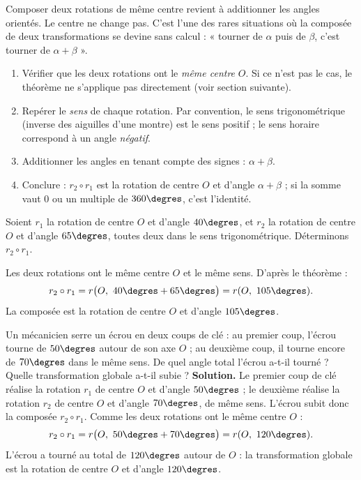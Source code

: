 \documentclass[11pt]{article}
\newcommand{\cle}[1]{{\popxbold\color{popdark}#1}}
\newcounter{popsec}
\newcounter{popsub}
\newcommand{\courssub}[1]{%
  \stepcounter{popsub}%
  \par\vspace{9pt}\noindent{\popxbold\fontsize{11.5}{13}\selectfont\color{popink}{\color{poporange}\thepopsec.\thepopsub}\hspace{6pt}#1}\par\nopagebreak\vspace{4pt}
}
\begin{document}
\begin{aretenir}
Composer deux rotations de même centre revient à \cle{additionner les angles orientés}. Le centre ne change pas. C'est l'une des rares situations où la composée de deux transformations se devine sans calcul : « tourner de $\alpha$ puis de $\beta$, c'est tourner de $\alpha + \beta$ ».
\end{aretenir}

\courssub{Méthode et exemple chiffré}

\begin{methode}
\begin{enumerate}
\item Vérifier que les deux rotations ont le \emph{même centre} $O$. Si ce n'est pas le cas, le théorème ne s'applique pas directement (voir section suivante).
\item Repérer le \emph{sens} de chaque rotation. Par convention, le sens trigonométrique (inverse des aiguilles d'une montre) est le sens positif ; le sens horaire correspond à un angle \emph{négatif}.
\item Additionner les angles en tenant compte des signes : $\alpha + \beta$.
\item Conclure : $r_2 \circ r_1$ est la rotation de centre $O$ et d'angle $\alpha + \beta$ ; si la somme vaut $0$ ou un multiple de $360\degres$, c'est l'identité.
\end{enumerate}
\end{methode}

\begin{exemplebox}
Soient $r_1$ la rotation de centre $O$ et d'angle $40\degres$, et $r_2$ la rotation de centre $O$ et d'angle $65\degres$, toutes deux dans le sens trigonométrique. Déterminons $r_2 \circ r_1$.

Les deux rotations ont le même centre $O$ et le même sens. D'après le théorème :
\[ r_2 \circ r_1 = r\bigl(O,\ 40\degres + 65\degres\bigr) = r(O,\ 105\degres). \]
La composée est la rotation de centre $O$ et d'angle $105\degres$.
\end{exemplebox}

\begin{exoresolu}
Un mécanicien serre un écrou en deux coups de clé : au premier coup, l'écrou tourne de $50\degres$ autour de son axe $O$ ; au deuxième coup, il tourne encore de $70\degres$ dans le même sens. De quel angle total l'écrou a-t-il tourné ? Quelle transformation globale a-t-il subie ?
\tcblower
\textbf{Solution.} Le premier coup de clé réalise la rotation $r_1$ de centre $O$ et d'angle $50\degres$ ; le deuxième réalise la rotation $r_2$ de centre $O$ et d'angle $70\degres$, de même sens. L'écrou subit donc la composée $r_2 \circ r_1$. Comme les deux rotations ont le même centre $O$ :
\[ r_2 \circ r_1 = r\bigl(O,\ 50\degres + 70\degres\bigr) = r(O,\ 120\degres). \]
L'écrou a tourné au total de $120\degres$ autour de $O$ : la transformation globale est la rotation de centre $O$ et d'angle $120\degres$.
\end{exoresolu}
\end{document}
